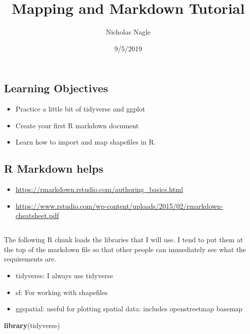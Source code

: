 \documentclass[]{article}
\title{Mapping and Markdown Tutorial}
\author{Nicholas Nagle}
\date{9/5/2019}
\newenvironment{Shaded}{\begin{snugshade}}{\end{snugshade}}
\newcommand{\KeywordTok}[1]{\textcolor[rgb]{0.13,0.29,0.53}{\textbf{#1}}}
\newcommand{\NormalTok}[1]{#1}
\providecommand{\tightlist}{%
  \setlength{\itemsep}{0pt}\setlength{\parskip}{0pt}}
\begin{document}
\maketitle

\hypertarget{learning-objectives}{%
\subsection{Learning Objectives}\label{learning-objectives}}

\begin{itemize}
\tightlist
\item
  Practice a little bit of tidyverse and ggplot
\item
  Create your first R markdown document
\item
  Learn how to import and map shapefiles in R.
\end{itemize}

\hypertarget{r-markdown-helps}{%
\subsection{R Markdown helps}\label{r-markdown-helps}}

\begin{itemize}
\tightlist
\item
  \url{https://rmarkdown.rstudio.com/authoring_basics.html}
\item
  \url{https://www.rstudio.com/wp-content/uploads/2015/02/rmarkdown-cheatsheet.pdf}
\end{itemize}

\hypertarget{section}{%
\subsection{}\label{section}}

The following R chunk loads the libraries that I will use. I tend to put
them at the top of the markdown file so that other people can
immediately see what the requirements are.

\begin{itemize}
\tightlist
\item
  tidyverse: I always use tidyverse
\item
  sf: For working with shapefiles
\item
  ggspatial: useful for plotting spatial data: includes openstreetmap
  basemap
\end{itemize}

\begin{Shaded}
\begin{Highlighting}[]
\KeywordTok{library}\NormalTok{(tidyverse)}
\end{Highlighting}
\end{Shaded}
\end{document}
